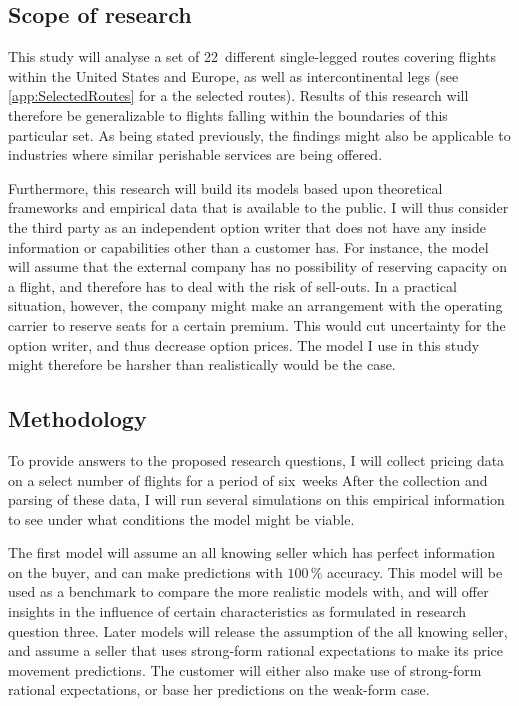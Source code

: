 \subsection{Scope of research}
This study will analyse a set of 22~different single-legged routes covering flights within the United States and Europe, as well as intercontinental legs (see \autoref{app:SelectedRoutes} for a the selected routes). Results of this research will therefore be generalizable to flights falling within the boundaries of this particular set. As being stated previously, the findings might also be applicable to industries where similar perishable services are being offered.

Furthermore, this research will build its models based upon theoretical frameworks and empirical data that is available to the public. I will thus consider the third party as an independent option writer that does not have any inside information or capabilities other than a customer has. For instance, the model will assume that the external company has no possibility of reserving capacity on a flight, and therefore has to deal with the risk of sell-outs. In a practical situation, however, the company might make an arrangement with the operating carrier to reserve seats for a certain premium. This would cut uncertainty for the option writer, and thus decrease option prices. The model I use in this study might therefore be harsher than realistically would be the case.


\subsection{Methodology}
To provide answers to the proposed research questions, I will collect pricing data on a select number of flights for a period of six~weeks After the collection and parsing of these data, I will run several simulations on this empirical information to see under what conditions the model might be viable.

The first model will assume an all knowing seller which has perfect information on the buyer, and can make predictions with $100\,\%$ accuracy. This model will be used as a benchmark to compare the more realistic models with, and will offer insights in the influence of certain characteristics as formulated in research question three. Later models will release the assumption of the all knowing seller, and assume a seller that uses strong-form rational expectations to make its price movement predictions. The customer will either also make use of strong-form rational expectations, or base her predictions on the weak-form case.


